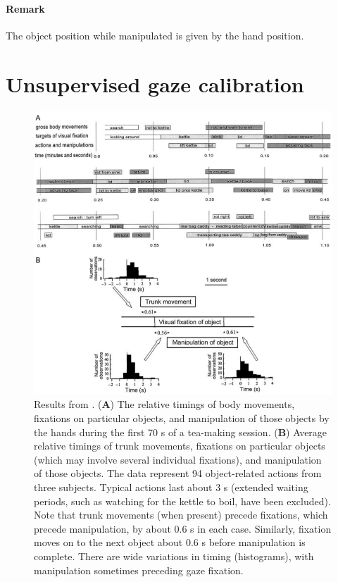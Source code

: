 \documentclass[11pt,a4paper]{article}
\begin{document}
\paragraph{Remark} The object position while manipulated is given by the hand position.

\section{Unsupervised gaze calibration}
\begin{figure}[!ht]
\begin{center}
\includegraphics[scale=0.5]{Pictures/GazeObjectBehavior_Land.png}
\end{center}
\caption{Results from \cite{Land2009}. (\textbf{A}) The relative timings of body movements, fixations on particular objects, and manipulation of those objects by the hands during the first 70 s of a tea-making session.
(\textbf{B}) Average relative timings of trunk movements,
fixations on particular objects (which may involve several individual fixations), and manipulation of those objects. The data represent
94 object-related actions from three subjects. Typical actions last about 3 s (extended waiting periods, such as watching for the kettle to
boil, have been excluded). Note that trunk movements (when present) precede fixations, which precede manipulation, by about 0.6 s in
each case. Similarly, fixation moves on to the next object about 0.6 s before manipulation is complete. There are wide variations in timing
(histograms), with manipulation sometimes preceding gaze fixation.\label{LandResults}}
\end{figure}

\clearpage


\end{document}
